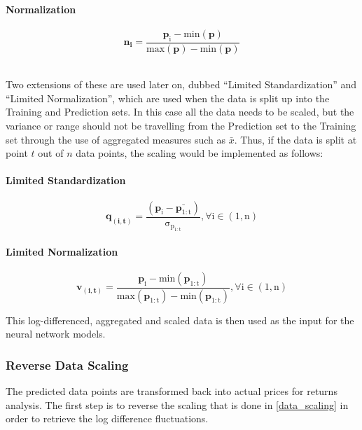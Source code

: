 \documentclass[a4paper,11pt,oneside]{article}
\theoremstyle{plain}
\theoremstyle{definition}
\begin{document}
	\paragraph{Normalization}
	
	\begin{equation}\label{eq_ltd_normalization}
	\mathbf{n_i}= \frac{\mathrm{\mathbf{p}_i - min(\mathbf{p}) }}{\mathrm{max(\mathbf{p}) -{min}(\mathbf{p})}}
	\end{equation}
	
	~\\
	Two extensions of these are used later on, dubbed ``Limited Standardization'' and ``Limited Normalization'', which are used when the data is split up into the Training and Prediction sets. In this case all the data needs to be scaled, but the variance or range should not be travelling from the Prediction set to the Training set through the use of aggregated measures such as $\bar{x}$. Thus, if the data is split at point $t$ out of $n$ data points, the scaling would be implemented as follows:
	
	\paragraph{Limited Standardization}
	
	\begin{equation}
	\mathbf{q_{(i, t)}} =\mathrm{ \frac{(\mathbf{p}_i - \bar{\mathbf{p}_{1:t}}) }{\sigma_{p_{1:t}}} , \forall  i \in (1, n)}
	\end{equation}
	
	\paragraph{Limited Normalization}
	
	\begin{equation}
	\mathbf{v_{(i, t)}}  = \mathrm{ \frac{\mathbf{p}_i - min(\mathbf{p}_{1:t}) }{max(\mathbf{p}_{1:t}) - min(\mathbf{p}_{1:t})} , \forall  i \in (1, n)}
	\end{equation}
	
	
	This log-differenced, aggregated and scaled data is then used as the input for the neural network models.
	
	\subsubsection{Reverse Data Scaling}\label{data_reverse_scaling}
	
	The predicted data points are transformed back into actual prices for returns analysis. The first step is to reverse the scaling that is done in \ref{data_scaling} in order to retrieve the log difference fluctuations.
	
\end{document}
